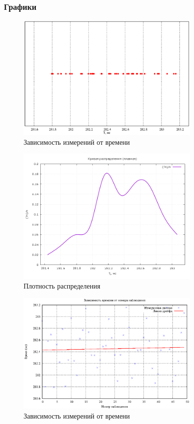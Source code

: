 \subsubsection{Графики}


\begin{figure}[ht!]
\centering
\includegraphics[width=0.8\textwidth]{time_i.eps}
\caption{Зависимость измерений от времени}
\label{fig:plot}
\end{figure}

\begin{figure}[ht!]
\centering
\includegraphics[width=0.8\textwidth]{smooth_distribution_curve.png}
\caption{Плотность распределения}
\label{fig:plot}
\end{figure}

\begin{figure}[ht!]
\centering
\includegraphics[width=0.8\textwidth]{time_drife.eps}
\caption{Зависимость измерений от времени}
\label{fig:plot}
\end{figure}

